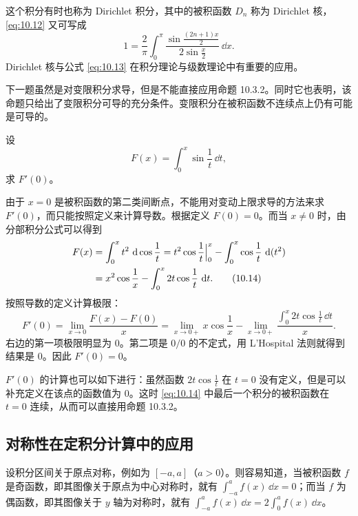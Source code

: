 \begin{xremark}
这个积分有时也称为 Dirichlet 积分，其中的被积函数 $D_n$ 称为 Dirichlet 核，\eqref{eq:10.12} 又可写成
\begin{equation}
  1=\frac2\pi\int_0^\pi\frac{\sin\frac{(2n+1)x}{2}}{2\sin\frac x2}\,\dd x.
  \tag{10.13}
  \label{eq:10.13}
\end{equation}
Dirichlet 核与公式 \eqref{eq:10.13} 在积分理论与级数理论中有重要的应用。
\end{xremark}

下一题虽然是对变限积分求导，但是不能直接应用命题 10.3.2。同时它也表明，该命题只给出了变限积分可导的充分条件。变限积分在被积函数不连续点上仍有可能是可导的。

\begin{xexample}[10.4.4]
设
\[
  F(x)=\int_0^x\sin\frac1t\,\dd t,
\]
求 $F'(0)$。
\end{xexample}
\begin{xsolution}
由于 $x=0$ 是被积函数的第二类间断点，不能用对变动上限求导的方法来求 $F'(0)$，而只能按照定义来计算导数。根据定义 $F(0)=0$。而当 $x\ne0$ 时，由分部积分公式可以得到
\begin{align}
  F(x)&=\int_0^x t^2\,\mathop{}\!\mathrm{d}\cos\frac1t
  =t^2\cos\frac1t\Big|_0^x-\int_0^x\cos\frac1t\,\mathop{}\!\mathrm{d}(t^2)\notag\\
  &=x^2\cos\frac1x-\int_0^x2t\cos\frac1t\,\mathop{}\!\mathrm{d} t.
  \tag{10.14}
  \label{eq:10.14}
\end{align}
按照导数的定义计算极限：
\[
  F'(0)=\lim_{x\to0}\frac{F(x)-F(0)}x
  =\lim_{x\to0+}x\cos\frac1x
  -\lim_{x\to0+}\frac{\int_0^x2t\cos\frac1t\,\dd t}{x}.
\]
右边的第一项极限明显为 0。第二项是 $0/0$ 的不定式，用 L'Hospital 法则就得到结果是 0。因此 $F'(0)=0$。
\end{xsolution}

\begin{xremark}
$F'(0)$ 的计算也可以如下进行：虽然函数 $2t\cos\frac1t$ 在 $t=0$ 没有定义，但是可以补充定义在该点的函数值为 0。这时 \eqref{eq:10.14} 中最后一个积分的被积函数在 $t=0$ 连续，从而可以直接用命题 10.3.2。
\end{xremark}

\subsection{对称性在定积分计算中的应用}

设积分区间关于原点对称，例如为 $[-a,a]$（$a>0$）。则容易知道，当被积函数 $f$ 是奇函数，即其图像关于原点为中心对称时，就有 $\int_{-a}^a f(x)\,\dd x=0$；而当 $f$ 为偶函数，即其图像关于 $y$ 轴为对称时，就有 $\int_{-a}^a f(x)\,\dd x=2\int_0^a f(x)\,\dd x$。

